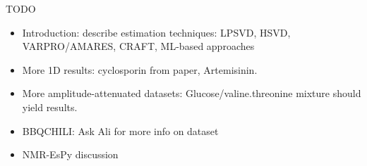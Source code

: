 \begin{frontmattersection}{TODO}
    \begin{itemize}
        \item Introduction: describe estimation techniques: LPSVD, HSVD,
            VARPRO/AMARES, CRAFT, ML-based approaches
        \item More 1D results: cyclosporin from paper, Artemisinin.
        \item More amplitude-attenuated datasets: Glucose/valine.threonine
            mixture should yield results.
        \item BBQCHILI: Ask Ali for more info on dataset
        \item NMR-EsPy discussion
    \end{itemize}
\end{frontmattersection}
